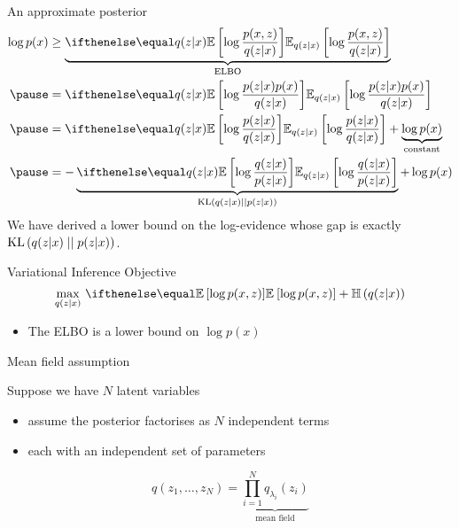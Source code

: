 \begin{frame}{An approximate posterior}
\begin{equation*}
\begin{aligned}
\log p(x) &\geq 
\underbrace{\E[q(z|x)] {\log{\frac{p(x, z)}{q(z|x)}}}}_{\text{ELBO}} \\
\pause
&= \E[q(z|x)] {\log{\frac{p(z|x)p(x)}{q(z|x)}}} \\
\pause
&= \E[q(z|x)] {\log{\frac{p(z|x)}{q(z|x)}}} + \underbrace{\log p(x)}_{\text{constant}}\\
\pause
&= - \underbrace{\E[q(z|x)] {\log{\frac{q(z|x)}{p(z|x)}}}}_{\KL{q(z|x)}{p(z|x)}} + \log p(x) 
\end{aligned}
\end{equation*}
\pause
We have derived a lower bound on the log-evidence whose gap is exactly $ \operatorname{KL}\left(q(z|x)\mid\mid p(z|x)\right) $.
\end{frame}


\begin{frame}{Variational Inference}
Objective
\begin{equation*}
\underset{q(z|x)}{\max}~\E{\log p(x,z)} + \Ent{q(z|x)}
\end{equation*}

\begin{itemize}
\item The ELBO is a lower bound on $ \log p(x) $
\end{itemize}

\end{frame}


\begin{frame}{Mean field assumption}

Suppose we have $N$ latent variables\\
\begin{itemize}
	\item assume the posterior factorises as $N$ independent terms
	\item each with an independent set of parameters
\end{itemize}


\begin{equation*}
q(z_1, \ldots, z_N) = \underbrace{\prod_{i=1}^N q_{\lambda_i}(z_i)}_{\text{mean field}}
\end{equation*}


\end{frame}

